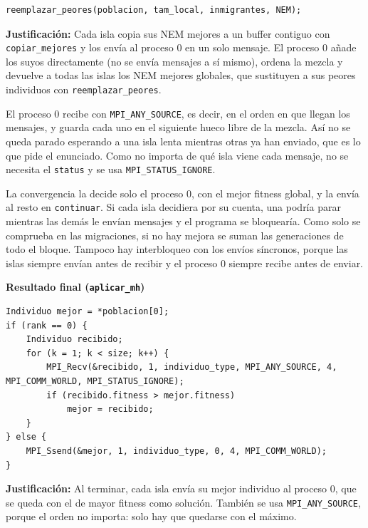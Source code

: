 \documentclass[12pt]{article}
\begin{document}
\begin{enumerate}
\begin{lstlisting}[style=EstiloC]
reemplazar_peores(poblacion, tam_local, inmigrantes, NEM);
\end{lstlisting}

\textbf{Justificación:} Cada isla copia sus NEM mejores a un buffer contiguo con \texttt{copiar\_mejores} y los envía al proceso 0 en un solo mensaje. El proceso 0 añade los suyos directamente (no se envía mensajes a sí mismo), ordena la mezcla y devuelve a todas las islas los NEM mejores globales, que sustituyen a sus peores individuos con \texttt{reemplazar\_peores}.

El proceso 0 recibe con \texttt{MPI\_ANY\_SOURCE}, es decir, en el orden en que llegan los mensajes, y guarda cada uno en el siguiente hueco libre de la mezcla. Así no se queda parado esperando a una isla lenta mientras otras ya han enviado, que es lo que pide el enunciado. Como no importa de qué isla viene cada mensaje, no se necesita el \texttt{status} y se usa \texttt{MPI\_STATUS\_IGNORE}.

La convergencia la decide solo el proceso 0, con el mejor fitness global, y la envía al resto en \texttt{continuar}. Si cada isla decidiera por su cuenta, una podría parar mientras las demás le envían mensajes y el programa se bloquearía. Como solo se comprueba en las migraciones, si no hay mejora se suman las generaciones de todo el bloque. Tampoco hay interbloqueo con los envíos síncronos, porque las islas siempre envían antes de recibir y el proceso 0 siempre recibe antes de enviar.

\vspace{0.5cm}


\medskip
\noindent\textbf{Resultado final (\texttt{aplicar\_mh})}\par
\smallskip

\begin{lstlisting}[style=EstiloC]
Individuo mejor = *poblacion[0];
if (rank == 0) {
	Individuo recibido;
	for (k = 1; k < size; k++) {
		MPI_Recv(&recibido, 1, individuo_type, MPI_ANY_SOURCE, 4, MPI_COMM_WORLD, MPI_STATUS_IGNORE);
		if (recibido.fitness > mejor.fitness)
			mejor = recibido;
	}
} else {
	MPI_Ssend(&mejor, 1, individuo_type, 0, 4, MPI_COMM_WORLD);
}
\end{lstlisting}

\textbf{Justificación:} Al terminar, cada isla envía su mejor individuo al proceso 0, que se queda con el de mayor fitness como solución. También se usa \texttt{MPI\_ANY\_SOURCE}, porque el orden no importa: solo hay que quedarse con el máximo.


\end{enumerate}
\end{document}
